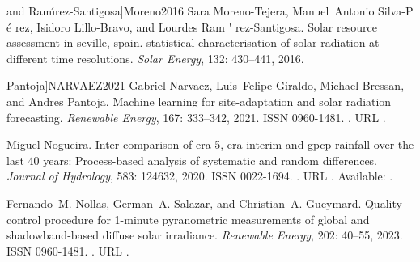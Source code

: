 \documentclass[letterpaper,12pt, twoside]{report}
\providecommand{\DIFdeltex}[1]{{\protect\color{red} \scriptsize #1}} %
\providecommand{\DIFdel}[1]{\texorpdfstring{\DIFdeltex{#1}}{}} %
\begin{document}
  and Ram{\'\i}rez-Santigosa]{Moreno2016}
\DIFdel{Sara Moreno-Tejera, Manuel~Antonio Silva-P}%
\DIFdel{\'e}%
\DIFdel{rez, Isidoro Lillo-Bravo, and
  Lourdes Ram}%
\DIFdel{\'}%
\DIFdel{rez-Santigosa.
}%
\DIFdel{Solar resource assessment in seville, spain. statistical
  characterisation of solar radiation at different time resolutions.
}%
\DIFdel{\emph{Solar Energy}, 132:}%
\DIFdel{430--441, 2016.
}%

  Pantoja]{NARVAEZ2021}
\DIFdel{Gabriel Narvaez, Luis~Felipe Giraldo, Michael Bressan, and Andres Pantoja.
}%
\DIFdel{Machine learning for site-adaptation and solar radiation forecasting.
}%
\DIFdel{\emph{Renewable Energy}, 167:}%
\DIFdel{333--342, 2021.
}%
\DIFdel{ISSN 0960-1481.
}%
\DIFdel{.
}%
\DIFdel{URL
  }%
\DIFdel{.
}%

\DIFdel{Miguel Nogueira.
}%
\DIFdel{Inter-comparison of era-5, era-interim and gpcp rainfall over the
  last 40 years: Process-based analysis of systematic and random differences.
}%
\DIFdel{\emph{Journal of Hydrology}, 583:}%
\DIFdel{124632, 2020.
}%
\DIFdel{ISSN 0022-1694.
}%
\DIFdel{.
}%
\DIFdel{URL
  }%
\DIFdel{.
}%
\DIFdel{Available: }%
\DIFdel{.
}%

\DIFdel{Fernando~M. Nollas, German~A. Salazar, and Christian~A. Gueymard.
}%
\DIFdel{Quality control procedure for 1-minute pyranometric measurements of
  global and shadowband-based diffuse solar irradiance.
}%
\DIFdel{\emph{Renewable Energy}, 202:}%
\DIFdel{40--55, 2023.
}%
\DIFdel{ISSN 0960-1481.
}%
\DIFdel{.
}%
\DIFdel{URL
  }%
\DIFdel{.
}%
\end{document}
